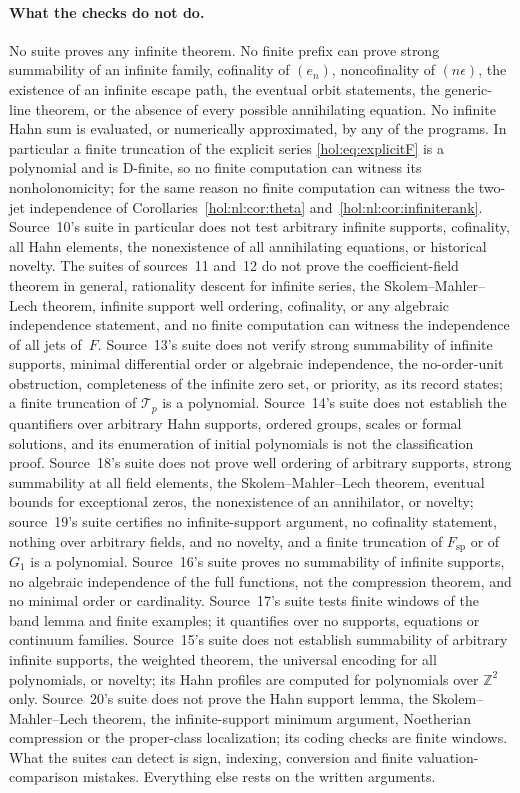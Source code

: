\documentclass[11pt]{article}
\numberwithin{equation}{section}
\theoremstyle{definition}
\theoremstyle{remark}
\newcommand{\Z}{\mathbb Z}
\begin{document}
\paragraph{What the checks do not do.}
No suite proves any infinite theorem. No finite prefix can prove strong
summability of an infinite family, cofinality of $(e_n)$, noncofinality of
$(n\epsilon)$, the existence of an infinite escape path, the eventual orbit
statements, the generic-line theorem, or the absence of every possible
annihilating equation. No infinite Hahn sum is evaluated, or numerically
approximated, by any of the programs. In particular a finite truncation of the
explicit series \eqref{hol:eq:explicitF} is a polynomial and is D-finite, so no
finite computation can witness its nonholonomicity; for the same reason no
finite computation can witness the two-jet independence of
Corollaries~\ref{hol:nl:cor:theta} and~\ref{hol:nl:cor:infiniterank}.
Source~10's suite in particular does not test arbitrary infinite supports,
cofinality, all Hahn elements, the nonexistence of all annihilating
equations, or historical novelty. The suites of sources~11 and~12 do not
prove the coefficient-field theorem in general, rationality descent for
infinite series, the Skolem--Mahler--Lech theorem, infinite support well
ordering, cofinality, or any algebraic independence statement, and no finite
computation can witness the independence of all jets of~$F$. Source~13's
suite does not verify strong summability of infinite supports, minimal
differential order or algebraic independence, the no-order-unit obstruction,
completeness of the infinite zero set, or priority, as its record states; a
finite truncation of $\mathcal T_p$ is a polynomial. Source~14's suite does
not establish the quantifiers over arbitrary Hahn supports, ordered groups,
scales or formal solutions, and its enumeration of initial polynomials is not
the classification proof. Source~18's suite does not prove well ordering of
arbitrary supports, strong summability at all field elements, the
Skolem--Mahler--Lech theorem, eventual bounds for exceptional zeros, the
nonexistence of an annihilator, or novelty; source~19's suite certifies no
infinite-support argument, no cofinality statement, nothing over arbitrary
fields, and no novelty, and a finite truncation of $F_{\mathrm{sp}}$ or of
$G_1$ is a polynomial. Source~16's suite proves no summability of infinite
supports, no algebraic independence of the full functions, not the
compression theorem, and no minimal order or cardinality. Source~17's suite
tests finite windows of the band lemma and finite examples; it quantifies over
no supports, equations or continuum families. Source~15's suite does not
establish summability of arbitrary infinite supports, the weighted theorem, the
universal encoding for all polynomials, or novelty; its Hahn profiles are
computed for polynomials over $\Z^2$ only. Source~20's suite does not prove
the Hahn support lemma, the Skolem--Mahler--Lech theorem, the infinite-support
minimum argument, Noetherian compression or the proper-class localization; its
coding checks are finite windows. What the suites
can detect is sign,
indexing, conversion and finite valuation-comparison mistakes. Everything else
rests on the written arguments.
\end{document}
